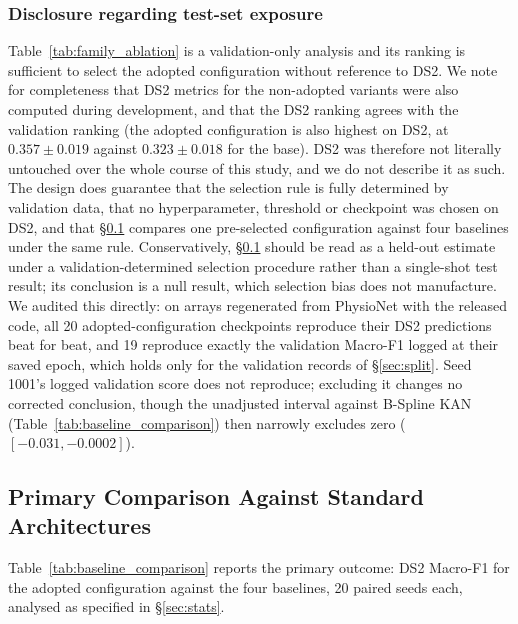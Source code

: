 \documentclass[journal,twoside,web]{ieeecolor}
\begin{document}
\subsubsection*{Disclosure regarding test-set exposure}
Table~\ref{tab:family_ablation} is a validation-only analysis and its ranking is sufficient to select the adopted configuration without reference to DS2. We note for completeness that DS2 metrics for the non-adopted variants were also computed during development, and that the DS2 ranking agrees with the validation ranking (the adopted configuration is also highest on DS2, at $0.357\pm0.019$ against $0.323\pm0.018$ for the base). DS2 was therefore not literally untouched over the whole course of this study, and we do not describe it as such. The design does guarantee that the selection rule is fully determined by validation data, that no hyperparameter, threshold or checkpoint was chosen on DS2, and that \S\ref{sec:results_primary} compares one pre-selected configuration against four baselines under the same rule. Conservatively, \S\ref{sec:results_primary} should be read as a held-out estimate under a validation-determined selection procedure rather than a single-shot test result; its conclusion is a null result, which selection bias does not manufacture. We audited this directly: on arrays regenerated from PhysioNet with the released code, all 20 adopted-configuration checkpoints reproduce their DS2 predictions beat for beat, and 19 reproduce exactly the validation Macro-F1 logged at their saved epoch, which holds only for the validation records of \S\ref{sec:split}. Seed 1001's logged validation score does not reproduce; excluding it changes no corrected conclusion, though the unadjusted interval against B-Spline KAN (Table~\ref{tab:baseline_comparison}) then narrowly excludes zero ($[-0.031,-0.0002]$).

\subsection{Primary Comparison Against Standard Architectures}
\label{sec:results_primary}
Table~\ref{tab:baseline_comparison} reports the primary outcome: DS2 Macro-F1 for the adopted configuration against the four baselines, 20 paired seeds each, analysed as specified in \S\ref{sec:stats}.
\end{document}
